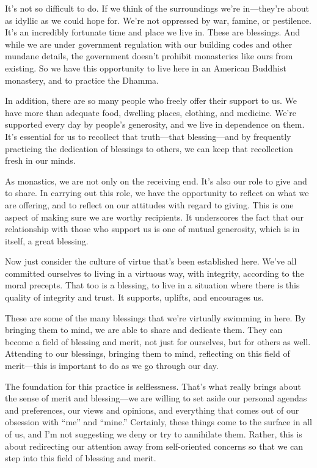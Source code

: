It's not so difficult to do. If we think of the surroundings we're 
in---they're about as idyllic as we could hope for. We're not oppressed 
by war, famine, or pestilence. It's an incredibly fortunate time and 
place we live in. These are blessings. And while we are under 
government regulation with our building codes and other mundane 
details, the government doesn't prohibit monasteries like ours from 
existing. So we have this opportunity to live here in an American 
Buddhist monastery, and to practice the Dhamma.

In addition, there are so many people who freely offer their support to 
us. We have more than adequate food, dwelling places, clothing, and 
medicine. We're supported every day by people's generosity, and we live 
in dependence on them. It's essential for us to recollect that 
truth---that blessing---and by frequently practicing the dedication of 
blessings to others, we can keep that recollection fresh in our minds.

As monastics, we are not only on the receiving end. It's also our role 
to give and to share. In carrying out this role, we have the 
opportunity to reflect on what we are offering, and to reflect on our 
attitudes with regard to giving. This is one aspect of making sure we 
are worthy recipients. It underscores the fact that our relationship 
with those who support us is one of mutual generosity, which is in 
itself, a great blessing.

Now just consider the culture of virtue that's been established here. 
We've all committed ourselves to living in a virtuous way, with 
integrity, according to the moral precepts. That too is a blessing, to 
live in a situation where there is this quality of integrity and trust. 
It supports, uplifts, and encourages us.

These are some of the many blessings that we're virtually swimming in 
here. By bringing them to mind, we are able to share and dedicate them. 
They can become a field of blessing and merit, not just for ourselves, 
but for others as well. Attending to our blessings, bringing them to 
mind, reflecting on this field of merit---this is important to do as we 
go through our day.

The foundation for this practice is selflessness. That's what really 
brings about the sense of merit and blessing---we are willing to set 
aside our personal agendas and preferences, our views and opinions, and 
everything that comes out of our obsession with ``me'' and ``mine.'' 
Certainly, these things come to the surface in all of us, and I'm not 
suggesting we deny or try to annihilate them. Rather, this is about 
redirecting our attention away from self-oriented concerns so that we 
can step into this field of blessing and merit.

